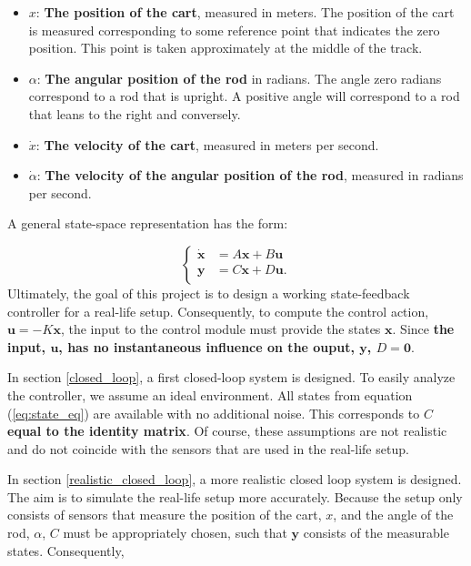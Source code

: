 \documentclass[a4paper,10pt]{article}
\theoremstyle{bluehomework}
\numberwithin{equation}{section}
\begin{document}
\begin{itemize}
  \item $x$: \textbf{The position of the cart}, measured in meters. The position of the cart is measured corresponding to some reference point that indicates the zero position. This point is taken approximately at the middle of the track.
  \item $\alpha$: \textbf{The angular position of the rod} in radians. The angle zero radians correspond to a rod that is upright. A positive angle will correspond to a rod that leans to the right and conversely. 
  \item $\dot{x}$: \textbf{The velocity of the cart}, measured in meters per second.
  \item $\dot{\alpha}$: \textbf{The velocity of the angular position of the rod}, measured in radians per second.
\end{itemize}
A general state-space representation has the form:

\begin{equation} \label{eq:general_ss}
  \begin{cases}
    \dot{\mathbf{x}} &= A\mathbf{x} + B\mathbf{u} \\
    \mathbf{y} &= C\mathbf{x} + D\mathbf{u}. \\
  \end{cases}
\end{equation}
Ultimately, the goal of this project is to design a working state-feedback controller for a real-life setup. Consequently, to compute the control action, $\mathbf{u}=-K\mathbf{x}$, the input to the control module must provide the states $\mathbf{x}$. Since \textbf{the input, $\mathbf{u}$, has no instantaneous influence on the ouput, $\mathbf{y}$, $D = \mathbf{0}$}.
\medskip

In section \ref{closed_loop}, a first closed-loop system is designed. To easily analyze the controller, we assume an ideal environment. All states from equation (\ref{eq:state_eq}) are available with no additional noise. This corresponds to \textbf{$C$ equal to the identity matrix}. Of course, these assumptions are not realistic and do not coincide with the sensors that are used in the real-life setup.
\medskip  

In section \ref{realistic_closed_loop}, a more realistic closed loop system is designed. The aim is to simulate the real-life setup more accurately. Because the setup only consists of sensors that measure the position of the cart, $x$, and the angle of the rod, $\alpha$, $C$ must be appropriately chosen, such that $\mathbf{y}$ consists of the measurable states. Consequently, 
\end{document}
